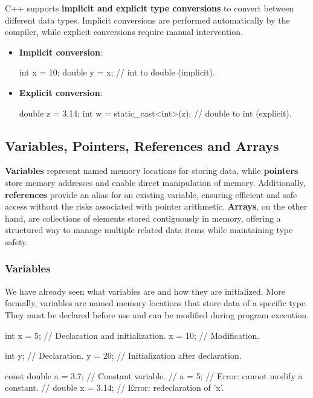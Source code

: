 C++ supports \textbf{implicit and explicit type conversions} to convert between different data types. Implicit conversions are performed automatically by the compiler, while explicit conversions require manual intervention.

\begin{itemize}
    \item \textbf{Implicit conversion}:
    \begin{codeblock}[language=C++, numbers=none]
int x = 10;
double y = x; // int to double (implicit).
    \end{codeblock}
    \item \textbf{Explicit conversion}:
    \begin{codeblock}[language=C++, numbers=none]
double z = 3.14;
int w = static_cast<int>(z); // double to int (explicit).
    \end{codeblock}
\end{itemize}

\subsection{Variables, Pointers, References and Arrays}

\textbf{Variables} represent named memory locations for storing data, while \textbf{pointers} store memory addresses and enable direct manipulation of memory. Additionally, \textbf{references} provide an alias for an existing variable, ensuring efficient and safe access without the risks associated with pointer arithmetic. \textbf{Arrays}, on the other hand, are collections of elements stored contiguously in memory, offering a structured way to manage multiple related data items while maintaining type safety.

\subsubsection{Variables}

We have already seen what variables are and how they are initialized. More formally, variables are named memory locations that store data of a specific type. They must be declared before use and can be modified during program execution.

\begin{codeblock}[language=C++]
int x = 5;              // Declaration and initialization.
x = 10;                 // Modification.

int y;                  // Declaration.
y = 20;                 // Initialization after declaration.

const double a = 3.7;   // Constant variable.
// a = 5;               // Error: cannot modify a constant.
// double x = 3.14;     // Error: redeclaration of 'x'.
\end{codeblock}

